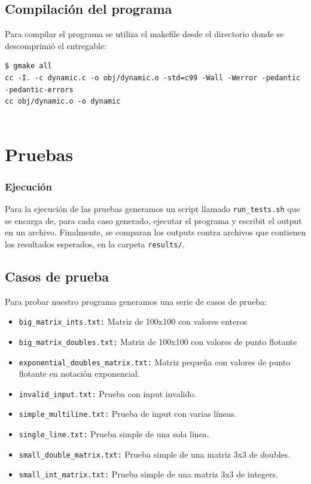 \documentclass[a4paper,10pt, spanish]{article}
\begin{document}


\lstset{
  language=bash,
  basicstyle=\small\ttfamily
}

\subsection{Compilación del programa}
Para compilar el programa se utiliza el makefile desde el directorio donde se descomprimió el entregable:
\begin{lstlisting}
$ gmake all
cc -I. -c dynamic.c -o obj/dynamic.o -std=c99 -Wall -Werror -pedantic -pedantic-errors
cc obj/dynamic.o -o dynamic
	
\end{lstlisting}

\section{Pruebas}

\subsubsection{Ejecución}

Para la ejecución de las pruebas generamos un script llamado \lstinline{run_tests.sh} que se encarga de, para cada caso generado, ejecutar el programa y escribit el output en un archivo.
Finalmente, se comparan los outputs contra archivos que contienen los resultados esperados, en la carpeta \lstinline{results/}.

\subsection{Casos de prueba}

Para probar nuestro programa generamos una serie de casos de prueba:

\begin{itemize}
  \item \lstinline{big_matrix_ints.txt:} Matriz de 100x100 con valores enteros
	\item \lstinline{big_matrix_doubles.txt:} Matriz de 100x100 con valores de punto flotante
  \item \lstinline{exponential_doubles_matrix.txt:} Matriz pequeña con valores de punto flotante en notación exponencial. 
  \item \lstinline{invalid_input.txt:} Prueba con input invalido. 
  \item \lstinline{simple_multiline.txt:} Prueba de input con varias líneas. 
  \item \lstinline{single_line.txt:} Prueba simple de una sola línea. 
  \item \lstinline{small_double_matrix.txt:} Prueba simple de una matriz 3x3 de doubles. 
  \item \lstinline{small_int_matrix.txt:} Prueba simple de una matriz 3x3 de integers. 
\end{itemize}
\end{document}
